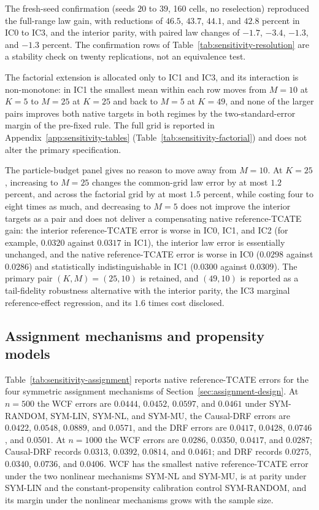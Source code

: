 The fresh-seed confirmation (seeds $20$ to $39$, 160 cells, no reselection) reproduced the full-range law gain, with reductions of $46.5$, $43.7$, $44.1$, and $42.8$ percent in IC0 to IC3, and the interior parity, with paired law changes of $-1.7$, $-3.4$, $-1.3$, and $-1.3$ percent. The confirmation rows of Table~\ref{tab:sensitivity-resolution} are a stability check on twenty replications, not an equivalence test.

The factorial extension is allocated only to IC1 and IC3, and its interaction is non-monotone: in IC1 the smallest mean within each row moves from $M=10$ at $K=5$ to $M=25$ at $K=25$ and back to $M=5$ at $K=49$, and none of the larger pairs improves both native targets in both regimes by the two-standard-error margin of the pre-fixed rule. The full grid is reported in Appendix~\ref{app:sensitivity-tables} (Table~\ref{tab:sensitivity-factorial}) and does not alter the primary specification.

The particle-budget panel gives no reason to move away from $M=10$. At $K=25$, increasing to $M=25$ changes the common-grid law error by at most $1.2$ percent, and across the factorial grid by at most $1.5$ percent, while costing four to eight times as much, and decreasing to $M=5$ does not improve the interior targets as a pair and does not deliver a compensating native reference-TCATE gain: the interior reference-TCATE error is worse in IC0, IC1, and IC2 (for example, $0.0320$ against $0.0317$ in IC1), the interior law error is essentially unchanged, and the native reference-TCATE error is worse in IC0 ($0.0298$ against $0.0286$) and statistically indistinguishable in IC1 ($0.0300$ against $0.0309$). The primary pair $(K,M)=(25,10)$ is retained, and $(49,10)$ is reported as a tail-fidelity robustness alternative with the interior parity, the IC3 marginal reference-effect regression, and its $1.6$ times cost disclosed.

\subsection{Assignment mechanisms and propensity models}\label{sec:results-assignment}

Table~\ref{tab:sensitivity-assignment} reports native reference-TCATE errors for the four symmetric assignment mechanisms of Section~\ref{sec:assignment-design}. At $n=500$ the WCF errors are $0.0444$, $0.0452$, $0.0597$, and $0.0461$ under SYM-RANDOM, SYM-LIN, SYM-NL, and SYM-MU, the Causal-DRF errors are $0.0422$, $0.0548$, $0.0889$, and $0.0571$, and the DRF errors are $0.0417$, $0.0428$, $0.0746$, and $0.0501$. At $n=1000$ the WCF errors are $0.0286$, $0.0350$, $0.0417$, and $0.0287$; Causal-DRF records $0.0313$, $0.0392$, $0.0814$, and $0.0461$; and DRF records $0.0275$, $0.0340$, $0.0736$, and $0.0406$. WCF has the smallest native reference-TCATE error under the two nonlinear mechanisms SYM-NL and SYM-MU, is at parity under SYM-LIN and the constant-propensity calibration control SYM-RANDOM, and its margin under the nonlinear mechanisms grows with the sample size.

